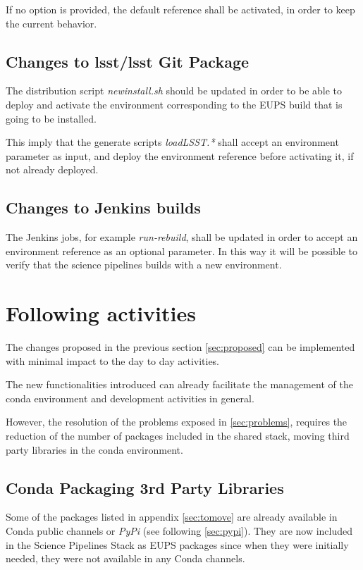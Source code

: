If no option is provided, the default reference shall be activated, in order to keep the current behavior.


\subsection{Changes to lsst/lsst Git Package} \label{sec:newinstall}

The distribution script \textit{newinstall.sh} should be updated in order to be able to deploy and activate the environment corresponding to the EUPS build that is going to be installed.

This imply that the generate scripts \textit{loadLSST.*} shall accept an environment parameter as input, and deploy the environment reference before activating it, if not already deployed.


\subsection{Changes to Jenkins builds} \label{sec:cibuilds}

The Jenkins jobs, for example \textit{run-rebuild}, shall be updated in order to accept an environment reference as an optional parameter.
In this way it will be possible to verify that the science pipelines builds with a new environment.


\newpage
\section{Following activities} \label{sec:follows}

The changes proposed in the previous section \ref{sec:proposed} can be implemented with minimal impact to the day to day activities.

The new functionalities introduced can already facilitate the management of the conda environment and development activities in general.

However, the resolution of the problems exposed in \ref{sec:problems}, requires the reduction of the number of packages included in the shared stack, moving third party libraries in the conda environment.


\subsection{Conda Packaging 3rd Party Libraries} \label{sec:3rdpkgs}

Some of the packages listed in appendix \ref{sec:tomove} are already available in Conda public channels or \textit{PyPi} (see following \ref{sec:pypi}).
They are now included in the Science Pipelines Stack as EUPS packages since when they were initially needed, they were not available in any Conda channels.

